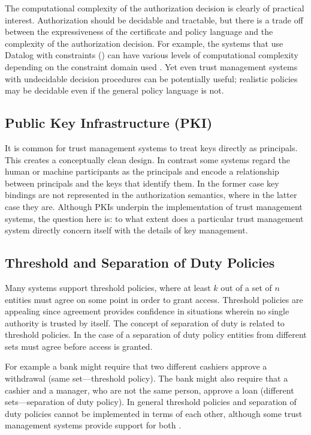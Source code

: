 The computational complexity of the authorization decision is clearly of practical interest.
Authorization should be decidable and tractable, but there is a trade off between the
expressiveness of the certificate and policy language and the complexity of the authorization
decision. For example, the systems that use Datalog with constraints (\datalogc) can have
various levels of computational complexity depending on the constraint domain used
\cite{Li:DCFTML}. Yet even trust management systems with undecidable decision procedures can be
potentially useful; realistic policies may be decidable even if the general policy language is
not.

\subsection{Public Key Infrastructure (PKI)}

It is common for trust management systems to treat keys directly as principals. This creates a
conceptually clean design. In contrast some systems regard the human or machine participants as
the principals and encode a relationship between principals and the keys that identify them. In
the former case key bindings are not represented in the authorization semantics, where in the
latter case they are. Although PKIs underpin the implementation of trust management systems, the
question here is: to what extent does a particular trust management system directly concern
itself with the details of key management.

\subsection{Threshold and Separation of Duty Policies}

Many systems support threshold policies, where at least $k$ out of a set of $n$ entities must
agree on some point in order to grant access. Threshold policies are appealing since agreement
provides confidence in situations wherein no single authority is trusted by itself. The concept
of separation of duty is related to threshold policies. In the case of a separation of duty
policy entities from different sets must agree before access is granted.

For example a bank might require that two different cashiers approve a withdrawal (same
set---threshold policy). The bank might also require that a cashier and a manager, who are not
the same person, approve a loan (different sets---separation of duty policy). In general
threshold policies and separation of duty policies cannot be implemented in terms of each other,
although some trust management systems provide support for both \cite{Li:DRBTMF}.

